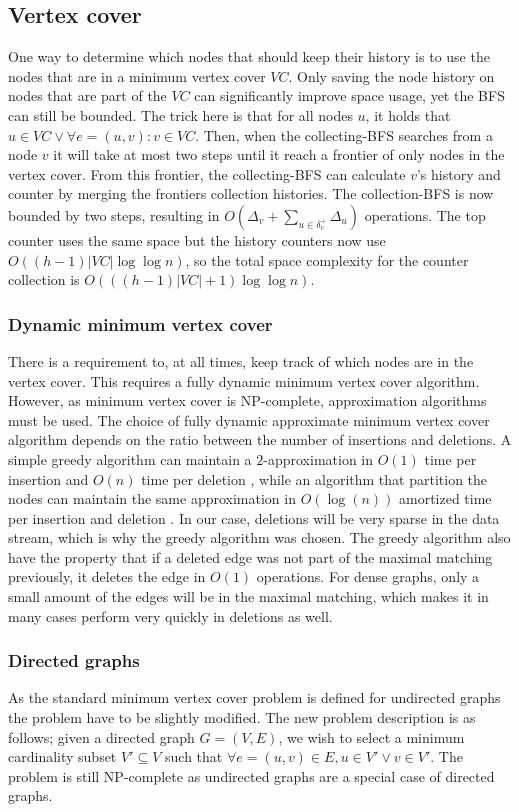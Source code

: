 \subsection{Vertex cover}
One way to determine which nodes that should keep their history is to use the nodes that are in a minimum vertex cover $VC$. Only saving the node history on nodes that are part of the $VC$ can significantly improve space usage, yet the BFS can still be bounded. The trick here is that for all nodes $u$, it holds that $u \in VC \vee \forall e = (u,v) : v \in VC$. Then, when the collecting-BFS searches from a node $v$ it will take at most two steps until it reach a frontier of only nodes in the vertex cover. From this frontier, the collecting-BFS can calculate $v$'s history and counter by merging the frontiers collection histories. The collection-BFS is now bounded by two steps, resulting in $O(\Delta_v + \sum_{u \in \delta^+_v}{\Delta_u}) $ operations. The top counter uses the same space but the history counters now use $O((h-1)|VC| \log \log n)$, so the total space complexity for the counter collection is $O(((h-1)|VC| + 1 )\log \log n)$.

\subsubsection{Dynamic minimum vertex cover}
There is a requirement to, at all times, keep track of which nodes are in the vertex cover. This requires a fully dynamic minimum vertex cover algorithm. However, as minimum vertex cover is NP-complete, approximation algorithms must be used. The choice of fully dynamic approximate minimum vertex cover algorithm depends on the ratio between the number of insertions and deletions. A simple greedy algorithm can maintain a $2$-approximation in $O(1)$ time per insertion and $O(n)$ time per deletion \cite{2appdynvc}, while an algorithm that partition the nodes can maintain the same approximation in $O(\log(n))$ amortized time per insertion and deletion \cite{2appdynvclogn}. In our case, deletions will be very sparse in the data stream, which is why the greedy algorithm was chosen. The greedy algorithm also have the property that if a deleted edge was not part of the maximal matching previously, it deletes the edge in $O(1)$ operations. For dense graphs, only a small amount of the edges will be in the maximal matching, which makes it in many cases perform very quickly in deletions as well. 
 
\subsubsection{Directed graphs}
As the standard minimum vertex cover problem is defined for undirected graphs the problem have to be slightly modified. The new problem description is as follows; given a directed graph $G = (V,E)$, we wish to select a minimum cardinality subset $V' \subseteq V$ such that $\forall e = (u,v) \in E, u \in V' \vee v \in V'$. The problem is still NP-complete as undirected graphs are a special case of directed graphs. 

